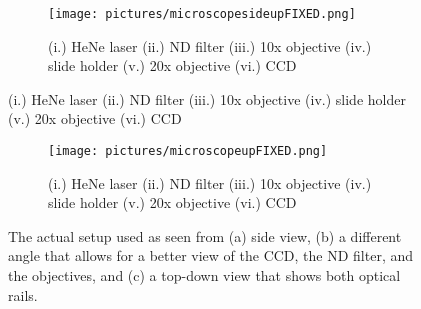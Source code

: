 \begin{figure}[ht!]
    \ContinuedFloat
    \begin{center}
        \begin{subfigure}[t]{\textwidth}
            \label{fig:OurMicroscopeSideUp}
            \texttt{[image: pictures/microscopesideupFIXED.png]}
            \caption{(i.) HeNe laser (ii.) ND filter (iii.) 10x objective (iv.)
                slide holder (v.) 20x objective (vi.) CCD
            }
        \end{subfigure}

    \end{center}
\end{figure}



\begin{figure}[ht!]
    \ContinuedFloat
    \begin{center}

        \begin{subfigure}[t]{\textwidth}
            \label{fig:OurMicroscopeUp}
            \texttt{[image: pictures/microscopeupFIXED.png]}
            \caption{(i.) HeNe laser (ii.) ND filter (iii.) 10x objective (iv.)
                slide holder (v.) 20x objective (vi.) CCD
            }
        \end{subfigure}

    \end{center}
    \caption{%
        The actual setup used as seen from (a) side view, (b) a different angle
        that allows for a better view of the CCD, the ND filter, and the
        objectives, and (c) a top-down view that shows both optical rails.
    }%
    \label{fig:OurMicroscope}
\end{figure}



